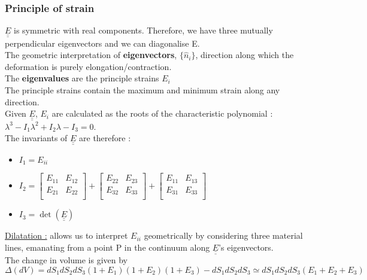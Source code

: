 \documentclass[../main.tex]{subfiles}
\begin{document}
\subsubsection{Principle of strain}
$\underline{\underline{E}}$ is symmetric with real components. Therefore, we have three mutually perpendicular eigenvectors and we can diagonalise E.\\
The geometric interpretation of \textbf{eigenvectors}, $\{\hat{n}_i\}$, direction along which the deformation is purely elongation/contraction.\\
The \textbf{eigenvalues} are the principle strains $E_i$\\
The principle strains contain the maximum and minimum strain along any direction.\\
Given $\underline{\underline{E}}$, $E_i$ are calculated as the roots of the characteristic polynomial : $\lambda^3-I_1 \lambda^2+I_2 \lambda - I_3 = 0$. \\
The invariants of $\underline{\underline{E}}$ are therefore :\begin{itemize}
    \item $I_1 = E_{ii}$\\
    \item $I_2 = \begin{bmatrix}
        E_{11} & E_{12}\\
        E_{21} & E_{22}\\
    \end{bmatrix} + \begin{bmatrix}
         E_{22} & E_{23}\\
        E_{32} & E_{33}\\
    \end{bmatrix} + \begin{bmatrix}
        E_{11} & E_{13}\\
        E_{31} & E_{33}\\
    \end{bmatrix}$\\
    \item $I_3 = \det (\underline{\underline{E}})$\\
\end{itemize}

\quad \underline{Dilatation :} allows us to interpret $E_{ii}$ geometrically by considering three material lines, emanating from a point P in the continuum along $\underline{\underline{E}}$'s eigenvectors.\\

The change in volume is given by $\Delta (dV) = dS_1 dS_2 dS_3(1+E_1)(1+E_2)(1+E_3)-dS_1dS_2dS_3 \simeq dS_1dS_2dS_3(E_1+E_2+E_3)$\\
\end{document}
